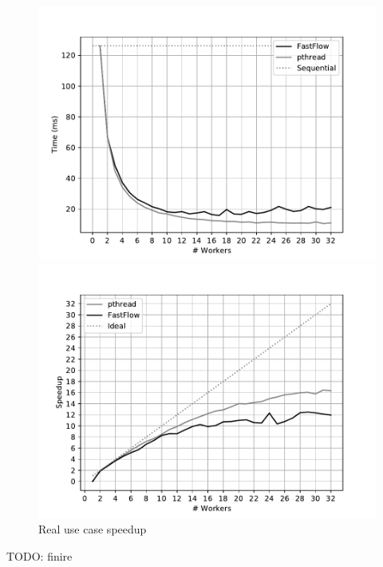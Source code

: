 \begin{figure}
\centering
\begin{minipage}{0.48\textwidth}
    \includegraphics[width=\textwidth]{plots/fastflow_performance_04_time.pdf}
\end{minipage}
\begin{minipage}{0.48\textwidth}
    \includegraphics[width=\textwidth]{plots/fastflow_speedup_08_time.pdf}
\end{minipage}
\caption{Real use case speedup}
\label{fig:real-case}
\end{figure}

TODO: finire